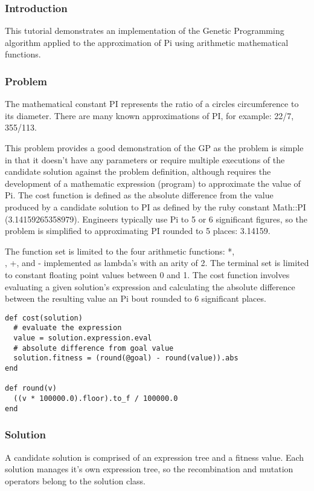 \subsubsection{Introduction}
This tutorial demonstrates an implementation of the Genetic Programming algorithm applied to the approximation of Pi using arithmetic mathematical functions.

\subsubsection{Problem}
The mathematical constant PI represents the ratio of a circles circumference to its diameter. There are many known approximations of PI, for example: 22/7, 355/113. 

This problem provides a good demonstration of the GP as the problem is simple in that it doesn't have any parameters or require multiple executions of the candidate solution against the problem definition, although requires the development of a mathematic expression (program) to approximate the value of Pi. The cost function is defined as the absolute difference from the value produced by a candidate solution to PI as defined by the ruby constant Math::PI (3.14159265358979). Engineers typically use Pi to 5 or 6 significant figures, so the problem is simplified to approximating PI rounded to 5 places: 3.14159.

The function set is limited to the four arithmetic functions: *, \\, +, and - implemented as lambda's with an arity of 2. The terminal set is limited to constant floating point values between 0 and 1. The cost function involves evaluating a given solution's expression and calculating the absolute difference between the resulting value an Pi bout rounded to 6 significant places.

\begin{lstlisting}
def cost(solution)
  # evaluate the expression
  value = solution.expression.eval
  # absolute difference from goal value
  solution.fitness = (round(@goal) - round(value)).abs
end

def round(v)
  ((v * 100000.0).floor).to_f / 100000.0
end
\end{lstlisting}

\subsubsection{Solution}
A candidate solution is comprised of an expression tree and a fitness value. Each solution manages it's own expression tree, so the recombination and mutation operators belong to the solution class.

